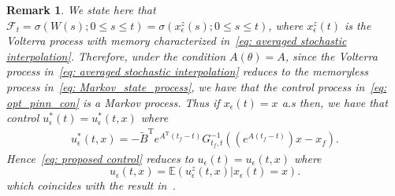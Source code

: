 \documentclass[12pt]{amsart}
\newtheorem{remark}{Remark}[section]
\renewcommand{\(}{\left (}
\renewcommand{\)}{\right )}
\numberwithin{equation}{section}
\begin{document}
\begin{remark}
We state here that $\mathcal{F}_t=\sigma(W(s); 0\leq s\leq t)=\sigma(x_{\epsilon}^z(s); 0\leq s\leq t)$, where $x_{\epsilon}^z(t)$ is the Volterra process with memory characterized in~\eqref{eq: averaged stochastic interpolation}. Therefore, under the condition $A(\theta)=A$, since the Volterra process in~\eqref{eq: averaged stochastic interpolation} reduces to the memoryless process in~\eqref{eq: Markov_state_process}, we have that the control process in~\eqref{eq: opt_pinn_con} is a Markov process. Thus if $x_{\epsilon}(t)=x$ a.s then, we have that control $u^*_{\epsilon}(t)=u^*_{\epsilon}(t,x)$ where
\begin{align}\label{eq: cond_opt_pinn_con}
u^*_{\epsilon}(t,x)=-\tilde{B}^{\mathrm{T}}e^{A^{\mathrm{T}}(t_f-t)}G_{t_f,t}^{-1}\left(\left(e^{A(t_f-t)}\right)x-x_f\right).
\end{align}
Hence~\eqref{eq: proposed control} reduces to $u_{\epsilon}(t)=u_{\epsilon}(t,x)$
where
\[
u_{\epsilon}(t,x)=\mathbb{E}(u_{\epsilon}^z(t,x)| x_{\epsilon}(t)=x).
\]
which coincides with the result in~\cite{YM-MA-AT-YC:24}. %
\end{remark}
\end{document}
